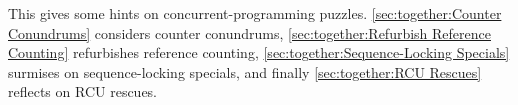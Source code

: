 
%


This 
gives some hints on concurrent-programming puzzles.
\cref{sec:together:Counter Conundrums}
considers counter conundrums,
\cref{sec:together:Refurbish Reference Counting}
refurbishes reference counting,
\cref{sec:together:Sequence-Locking Specials}
surmises on sequence-locking specials,
and finally
\cref{sec:together:RCU Rescues}
reflects on RCU rescues.







